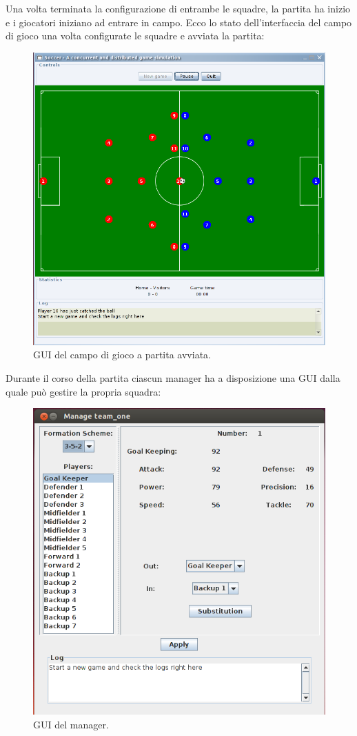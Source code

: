 Una volta terminata la configurazione di entrambe le squadre, la partita ha inizio e i giocatori iniziano ad entrare in campo. Ecco lo stato dell'interfaccia del campo di gioco una volta configurate le squadre e avviata la partita:
\begin{figure}[h]
	\centering
	\includegraphics[scale=.5,width=\textwidth]{images/field}
	\caption{GUI del campo di gioco a partita avviata.}
\end{figure}
\newpage
Durante il corso della partita ciascun manager ha a disposizione una GUI dalla quale può gestire la propria squadra:
\begin{figure}[h]
	\centering
	\includegraphics[scale=.5]{images/team_manager}
	\caption{GUI del manager.}
\end{figure}

